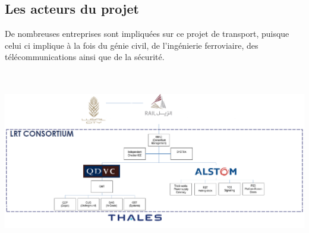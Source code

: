 \subsection{Les acteurs du projet}
De nombreuses entreprises sont impliquées sur ce projet de transport, puisque celui ci implique à la fois du génie civil, de l'ingénierie ferroviaire, des télécommunications ainsi que de la sécurité.
\begin{center}
\includegraphics[height=8cm]{ressources/images/figures/Consortium.png}
\end{center}

